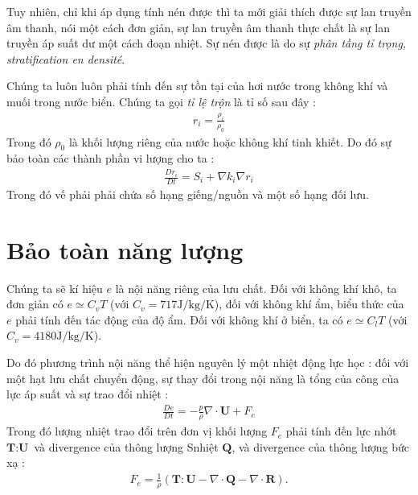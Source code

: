 \documentclass[DONG_HOC_KHI_QUYEN.tex]{subfiles}
\begin{document}
Tuy nhiên, chỉ khi áp dụng tính nén được thì ta mới giải thích được sự lan truyền âm thanh, nói một cách đơn giản, sự lan truyền âm thanh thực chất là sự lan truyền áp suất dư một cách đoạn nhiệt. Sự nén được là do sự \textit{phân tầng tỉ trọng, stratification en densité}.\\


Chúng ta luôn luôn phải tính đến sự tồn tại của hơi nước trong không khí và muối trong nước biển. Chúng ta gọi \textit{tỉ lệ trộn} là tỉ số sau đây :
\begin{equation}
	\begin{aligned}
		r_i = \frac{\rho_i}{\rho_0}
	\end{aligned}
\end{equation}
Trong đó $\rho_0$ là khối lượng riêng của nước hoặc không khí tinh khiết. Do đó sự bảo toàn các thành phần vi lượng cho ta :
\begin{equation}
	\begin{aligned}
		\frac{Dr_i}{Dt} = S_i + \nabla k_i \nabla r_i
	\end{aligned}
\end{equation}
Trong đó vế phải phải chứa số hạng giếng/nguồn và một số hạng đối lưu.
\section{Bảo toàn năng lượng}

Chúng ta sẽ kí hiệu $e$ là nội năng riêng của lưu chất. Đối với không khí khô, ta đơn giản có $e \simeq C_vT$ (với $C_v = 717  \unit{\joule\per\kilogram\per\kelvin}$), đối với không khí ẩm, biểu thức của $e$ phải tính đến tác động của độ ẩm. Đối với không khí ở biển, ta có $e \simeq C_lT$ (với $C_v = 4180  \unit{\joule\per\kilogram\per\kelvin}$).

Do đó phương trình nội năng thể hiện nguyên lý một nhiệt động lực học : đối với một hạt lưu chất chuyển động, sự thay đổi trong nội năng là tổng của công của lực áp suất và sự trao đổi nhiệt :
\begin{equation}
	\begin{aligned}
		\frac{De}{Dt} = -\frac{p}{\rho}\nabla \cdot \textbf{U} + F_e
	\end{aligned}
\end{equation}
Trong đó lượng nhiệt trao đổi trên đơn vị khối lượng $F_e$ phải tính đến lực nhớt $\textbf{T} : \textbf{U}$ và divergence của thông lượng Snhiệt $\textbf{Q}$, và divergence của thông lượng bức xạ : 
\begin{equation}
	\begin{aligned}
		F_e = \frac{1}{\rho} (\textbf{T} : \textbf{U} - \nabla \cdot \textbf{Q} - \nabla \cdot \textbf{R}).
	\end{aligned}
\end{equation}
\end{document}
